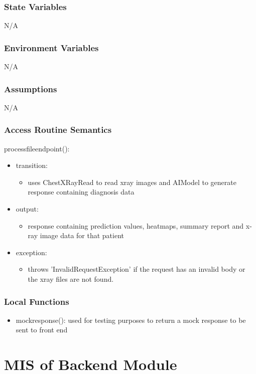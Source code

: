 \documentclass[12pt, titlepage]{article}
\begin{document}
\subsubsection{State Variables}
N/A
\subsubsection{Environment Variables}
N/A
\subsubsection{Assumptions}
N/A
\subsubsection{Access Routine Semantics}

\noindent processfileendpoint():
\begin{itemize}
\item transition: \begin{itemize}
    \item uses ChestXRayRead to read xray images and AIModel to generate response containing diagnosis data
\end{itemize}
\item output: \begin{itemize}
    \item response containing prediction values, heatmaps, summary report and x-ray image data for that patient
\end{itemize}
\item exception: \begin{itemize}
    \item throws 'InvalidRequestException' if the request has an invalid body or the xray files are not found.
\end{itemize}
\end{itemize}

\subsubsection{Local Functions}
\begin{itemize}
    \item mockresponse(): used for testing purposes to return a mock response to be sent to front end
\end{itemize}
\newpage


\section{MIS of Backend Module} \label{Module} 
\end{document}
